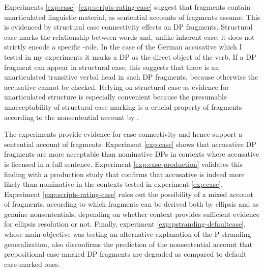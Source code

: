Experiments \ref{exp:case}--\ref{exp:scripts-rating-case} suggest that fragments contain unarticulated linguistic material, as sentential accounts of fragments assume. This is evidenced by structural case connectivity effects on DP fragments. Structural case marks the relationship between words and, unlike inherent case, it does not strictly encode a specific \texttheta-role. In the case of the German accusative which I tested in my experiments it marks a DP as the direct object of the verb. If a DP fragment can appear in structural case, this suggests that there is an unarticulated transitive verbal head in such DP fragments, because otherwise the accusative cannot be checked. Relying on structural case as evidence for unarticulated structure is especially convenient because the presumable unacceptability of structural case marking is a crucial property of fragments according to the nonsentential account by  \citet{barton.progovac2005}.

The experiments provide evidence for case connectivity and hence support a sentential account of fragments: Experiment \ref{exp:case} shows that accusative DP fragments are more acceptable than nominative DPs in contexts where accusative is licensed in a full sentence. Experiment \ref{exp:case-production} validates this finding with a production study that confirms that accusative is indeed more likely than nominative in the contexts tested in experiment \ref{exp:case}. Experiment \ref{exp:scripts-rating-case} rules out the possibility of a mixed account of fragments, according to which fragments can be derived both by ellipsis and as genuine nonsententials, depending on whether context provides sufficient evidence for ellipsis resolution or not. Finally, experiment \ref{exp:pstranding-defaultcase}, whose main objective was testing an alternative explanation of the P-stranding generalization, also disconfirms the prediction of the nonsentential account that prepositional case-marked DP fragments are degraded as compared to default case-marked ones.

